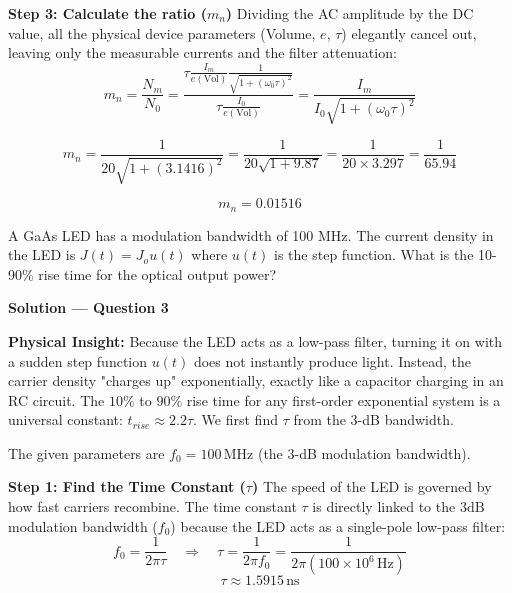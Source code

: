 \textbf{Step 3: Calculate the ratio ($m_n$)}
Dividing the AC amplitude by the DC value, all the physical device parameters (Volume, $e$, $\tau$) elegantly cancel out, leaving only the measurable currents and the filter attenuation:
\begin{equation*}
  m_n = \frac{N_m}{N_0} = \frac{\tau \frac{I_m}{e(\text{Vol})} \frac{1}{\sqrt{1+(\omega_0\tau)^2}}}{\tau \frac{I_0}{e(\text{Vol})}} = \frac{I_m}{I_0\sqrt{1+(\omega_0\tau)^2}}
\end{equation*}

\begin{equation*}
  m_n = \frac{1}{20\sqrt{1+(3.1416)^2}} = \frac{1}{20\sqrt{1+9.87}} = \frac{1}{20\times 3.297} = \frac{1}{65.94}
\end{equation*}

\begin{equation*}
  \boxed{m_n = 0.01516}
\end{equation*}

\begin{question}[Question 3]
A GaAs LED has a modulation bandwidth of 100 MHz. The current density in the LED is $J(t) = J_o u(t)$ where $u(t)$ is the step function. What is the 10-90\% rise time for the optical output power?
\end{question}

\textbf{\large Solution --- Question 3}

\textbf{Physical Insight:}
Because the LED acts as a low-pass filter, turning it on with a sudden step function $u(t)$ does not instantly produce light. Instead, the carrier density "charges up" exponentially, exactly like a capacitor charging in an RC circuit. The $10\%$ to $90\%$ rise time for any first-order exponential system is a universal constant: $t_{rise} \approx 2.2 \tau$. We first find $\tau$ from the 3-dB bandwidth.

The given parameters are $f_0 = 100\,\text{MHz}$ (the 3-dB modulation bandwidth).

\textbf{Step 1: Find the Time Constant ($\tau$)}
The speed of the LED is governed by how fast carriers recombine. The time constant $\tau$ is directly linked to the $3\text{dB}$ modulation bandwidth ($f_0$) because the LED acts as a single-pole low-pass filter:
\begin{equation*}
  f_0 = \frac{1}{2\pi\tau} \quad\Longrightarrow\quad \tau = \frac{1}{2\pi f_0} = \frac{1}{2\pi (100 \times 10^6\,\text{Hz})}
\end{equation*}
\begin{equation*}
  \tau \approx 1.5915\,\text{ns}
\end{equation*}

